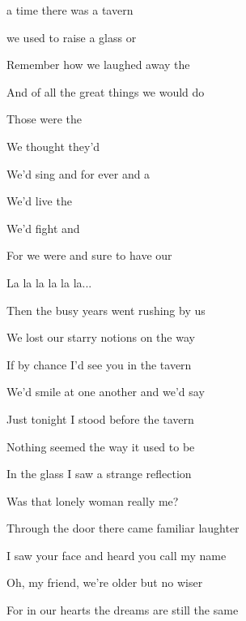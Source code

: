 

\zs
{} a time there was a tavern

 we used to raise a glass or 

Remember how we laughed away the 

And  of all the great things we would do
\ks

\zr
Those were the 

We thought they'd 

We'd sing and  for ever and a 

We'd live the 

We'd fight and 

For we were  and sure to have our 

La la la la la la...
\kr

\zs
Then the busy years went rushing by us

We lost our starry notions on the way

If by chance I'd see you in the tavern

We'd smile at one another and we'd say
\ks

\zr\kr

\zs
Just tonight I stood before the tavern

Nothing seemed the way it used to be

In the glass I saw a strange reflection

Was that lonely woman really me?
\ks

\zr\kr

\zs
Through the door there came familiar laughter

I saw your face and heard you call my name

Oh, my friend, we're older but no wiser

For in our hearts the dreams are still the same
\ks

\zr\kr

\kp
